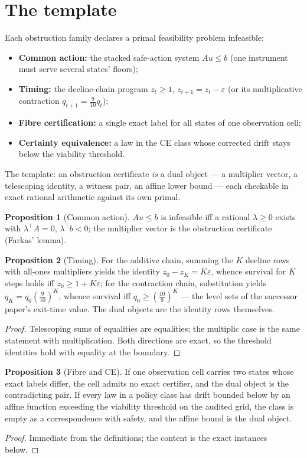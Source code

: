 \documentclass[10pt,twocolumn]{article}
\theoremstyle{definition}
\newtheorem{proposition}{Proposition}
\providecommand{\tightlist}{\setlength{\itemsep}{0pt}\setlength{\parskip}{0pt}}
\begin{document}
\section{The template}

Each obstruction family declares a primal feasibility problem infeasible:
\begin{itemize}\tightlist
\item \textbf{Common action:} the stacked safe-action system
$Au\le b$ (one instrument must serve several states' floors);
\item \textbf{Timing:} the decline-chain program $z_t\ge1$,
$z_{t+1}=z_t-\varepsilon$ (or its multiplicative contraction
$q_{t+1}=\tfrac9{10}q_t$);
\item \textbf{Fibre certification:} a single exact label for all states of
one observation cell;
\item \textbf{Certainty equivalence:} a law in the CE class whose
corrected drift stays below the viability threshold.
\end{itemize}
The template: an obstruction certificate \emph{is} a dual object --- a
multiplier vector, a telescoping identity, a witness pair, an affine lower
bound --- each checkable in exact rational arithmetic against its own
primal.

\begin{proposition}[Common action]
$Au\le b$ is infeasible iff a rational $\lambda\ge0$ exists with
$\lambda^{\top}A=0$, $\lambda^{\top}b<0$; the multiplier vector is the
obstruction certificate (Farkas' lemma).
\end{proposition}

\begin{proposition}[Timing]
\label{prop:timing}
For the additive chain, summing the $K$ decline rows with all-ones
multipliers yields the identity $z_0-z_K=K\varepsilon$, whence survival
for $K$ steps holds iff $z_0\ge1+K\varepsilon$; for the contraction
chain, substitution yields $q_K=q_0(\tfrac9{10})^K$, whence survival iff
$q_0\ge(\tfrac{10}9)^K$ --- the level sets of the successor paper's
exit-time value. The dual objects are the identity rows themselves.
\end{proposition}
\begin{proof}
Telescoping sums of equalities are equalities; the multiplic case is the
same statement with multiplication. Both directions are exact, so the
threshold identities hold with equality at the boundary.
\end{proof}

\begin{proposition}[Fibre and CE]
If one observation cell carries two states whose exact labels differ, the
cell admits no exact certifier, and the dual object is the contradicting
pair. If every law in a policy class has drift bounded below by an affine
function exceeding the viability threshold on the audited grid, the class
is empty as a correspondence with safety, and the affine bound is the dual
object.
\end{proposition}
\begin{proof}
Immediate from the definitions; the content is the exact instances below.
\end{proof}
\end{document}
